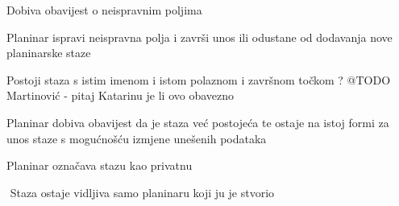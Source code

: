 \begin{packed_item}
\begin{packed_item}
\begin{packed_enum}
				\item $ $Dobiva obavijest o neispravnim poljima$ $
				\item $ $Planinar ispravi neispravna polja i završi unos ili odustane od dodavanja nove planinarske staze$ $
			\end{packed_enum}
			\item[4.a] $ $Postoji staza s istim imenom i istom polaznom i završnom točkom ? @TODO Martinović - pitaj Katarinu je li ovo obavezno$ $
			\item[] \begin{packed_enum}
				\item $ $Planinar dobiva obavijest da je staza već postojeća te ostaje na istoj formi za unos staze s mogućnošću izmjene unešenih podataka$ $
		\end{packed_enum}
			\item[5.a] $ $Planinar označava stazu kao privatnu$ $
			\item[] \begin{packed_enum}
				\item $ $ Staza ostaje vidljiva samo planinaru koji ju je stvorio $ $
			\end{packed_enum}
		\end{packed_item}
		\end{packed_item}
		
